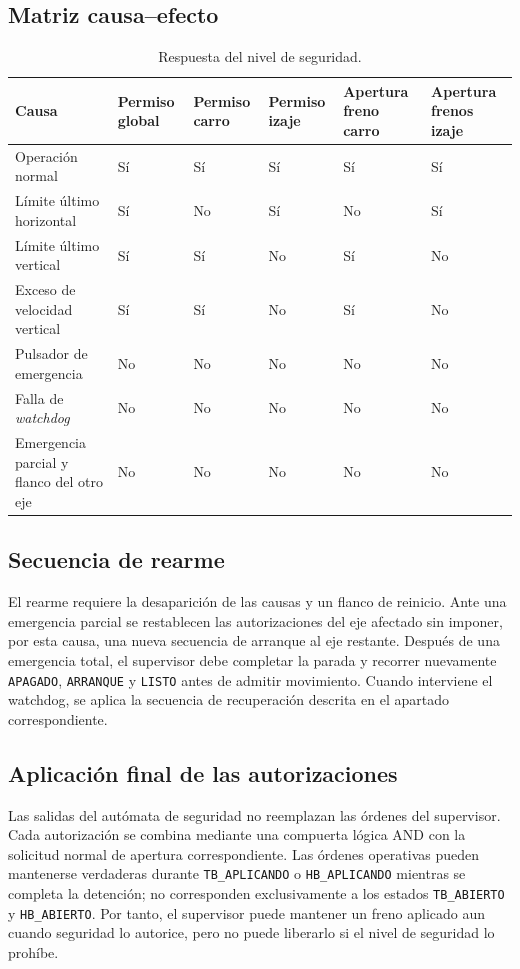 \documentclass[a4paper,10pt,onecolumn,journal]{ieeeconf}
\numberwithin{equation}{section}
\begin{document}

\subsection{Matriz causa--efecto}
\begin{table}[!htb]
\centering
\caption{Respuesta del nivel de seguridad.}
\begin{tabular}{L{4.2cm} C{1.8cm} C{1.8cm} C{1.8cm} C{2.0cm} C{2.0cm}}
\toprule
Causa & Permiso global & Permiso carro & Permiso izaje & Apertura freno carro & Apertura frenos izaje\\
\midrule
Operación normal & Sí & Sí & Sí & Sí & Sí\\
Límite último horizontal & Sí & No & Sí & No & Sí\\
Límite último vertical & Sí & Sí & No & Sí & No\\
Exceso de velocidad vertical & Sí & Sí & No & Sí & No\\
Pulsador de emergencia & No & No & No & No & No\\
Falla de \textit{watchdog} & No & No & No & No & No\\
Emergencia parcial y flanco del otro eje & No & No & No & No & No\\
\bottomrule
\end{tabular}
\end{table}


\subsection{Secuencia de rearme}

El rearme requiere la desaparición de las causas y un flanco de reinicio. Ante una emergencia parcial se restablecen las autorizaciones del eje afectado sin imponer, por esta causa, una nueva secuencia de arranque al eje restante. Después de una emergencia total, el supervisor debe completar la parada y recorrer nuevamente \texttt{APAGADO}, \texttt{ARRANQUE} y \texttt{LISTO} antes de admitir movimiento. Cuando interviene el watchdog, se aplica la secuencia de recuperación descrita en el apartado correspondiente.

\subsection{Aplicación final de las autorizaciones}
Las salidas del autómata de seguridad no reemplazan las órdenes del supervisor. Cada autorización se combina mediante una compuerta lógica AND con la solicitud normal de apertura correspondiente. Las órdenes operativas pueden mantenerse verdaderas durante \texttt{TB\_APLICANDO} o \texttt{HB\_APLICANDO} mientras se completa la detención; no corresponden exclusivamente a los estados \texttt{TB\_ABIERTO} y \texttt{HB\_ABIERTO}. Por tanto, el supervisor puede mantener un freno aplicado aun cuando seguridad lo autorice, pero no puede liberarlo si el nivel de seguridad lo prohíbe.
\end{document}
